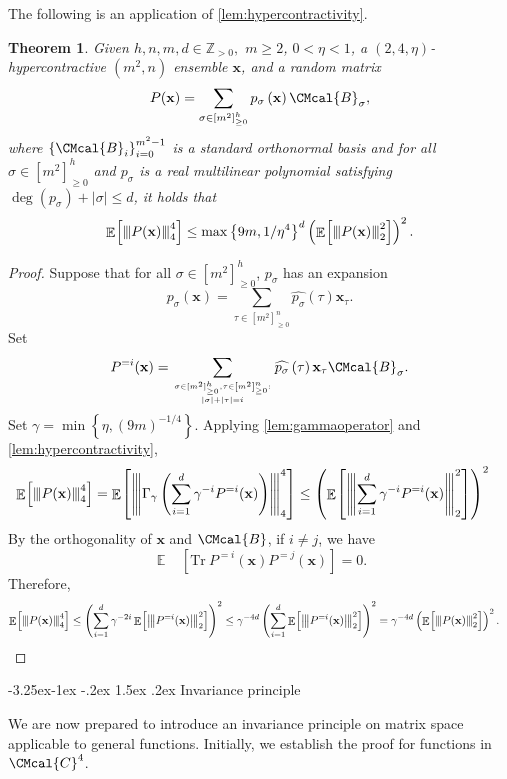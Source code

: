 \documentclass[10pt,a4paper]{article}
\makeatletter
\renewcommand{\subsection}{\@startsection{subsection}{2}{\z@}%
             {-3.25ex\@plus -1ex \@minus -.2ex}%
             {1.5ex \@plus .2ex}%
             {\normalfont\large\scshape\bfseries}}
\def\B{\CMcal{B}}
\def\C{\CMcal{C}}
\theoremstyle{plain}
\newtheorem{theorem}{Theorem}[section]
\theoremstyle{definition}
\newcommand {\minusspace} {\: \! \!}
\newcommand {\Fn} [2] {\ensuremath{ #1 \minusspace \Br{ #2 } }}
\newcommand {\set} [1] {\ensuremath{ \left\lbrace #1 \right\rbrace }}
\newcommand {\br} [1] {\ensuremath{ \left( #1 \right) }}
\newcommand {\Br} [1] {\ensuremath{ \left[ #1 \right] }}
\newcommand {\ab} [1] {\ensuremath{ \left| #1 \right| }}
\DeclareMathOperator*{\bigE}{\mathbb{E}}
\newcommand {\expec} [2] {\Fn{\bigE_{\substack{#1}}}{#2}}
\newcommand{\nnorm}[1]{{\left\vert\kern-0.25ex\left\vert\kern-0.25ex\left\vert #1
		\right\vert\kern-0.25ex\right\vert\kern-0.25ex\right\vert}}
\newcommand {\Tr} {\ensuremath{ \mathrm{Tr} }}
\newcommand{\posint}{{\mathbb Z}_{>0}}
\newcommand{\randx}{\ensuremath{\mathbf{x}}}
\newcommand{\1}{\mathbb{1}} %
\makeatother
\begin{document}
	The following is an application of \cref{lem:hypercontractivity}.
	\begin{theorem}\label{lem:hybridHC}
		Given $h,n,m,d\in\posint,$ $m\geq 2$, $0<\eta<1$, a $(2,4,\eta)$-hypercontractive  $(m^2,n)$ ensemble $\randx$, and a random matrix
 \begin{equation*}
P(\randx)=\sum_{\sigma\in\Br{m^2}_{\geq0}^h}p_\sigma\br{\randx}\B_\sigma,
	\end{equation*}
	where $\set{\B_i}_{i=0}^{m^2-1}$ is a standard orthonormal basis and for all $\sigma\in\Br{m^2}_{\geq0}^h$ and $p_\sigma$ is a real multilinear polynomial satisfying $\deg\br{p_\sigma}+\ab{\sigma}\leq d$, it holds that
   \[\expec{}{\nnorm{P(\randx)}_4^4}\leq\max\set{9m,1/\eta^4}^d\br{\expec{}{\nnorm{P(\randx)}_2^2}}^2.\]
	\end{theorem}
	\begin{proof}
	Suppose that for all $\sigma\in[m^2]_{\geq0}^h$, $p_\sigma$ has an expansion
\[p_\sigma(\randx)=\sum_{\tau\in\Br{m^2}_{\geq0}^n}\widehat{p_\sigma}(\tau)\randx_\tau.\]
		 Set $$P^{=i}(\randx)=\sum_{\genfrac{}{}{0pt}{}{\sigma\in[m^2]_{\geq0}^h,\tau\in\Br{m^2}_{\geq0}^n :}{\ab{\sigma}+\ab{\tau}=i}}\widehat{p_{\sigma}}\br{\tau}\randx_\tau\B_{\sigma}.$$
	 Set $\gamma=\min\set{\eta,\br{9m}^{-1/4}}$. Applying \cref{lem:gammaoperator} and \cref{lem:hypercontractivity},
		\begin{align*} \expec{}{\nnorm{P(\randx)}_4^4}&= \expec{}{\nnorm{\Gamma_{\gamma}\br{\sum_{i=1}^{d}\gamma^{-i} P^{=i}(\randx)}}_4^4}\leq \br{\expec{}{\nnorm{\sum_{i=1}^{d}\gamma^{-i} P^{=i}(\randx)}^2_2}}^{2}
		\end{align*}
		By the orthogonality of $\randx$ and $\B$, if $i\ne j$, we have
		\[\expec{}{\Tr~P^{=i}(\randx)P^{=j}(\randx)}=0.\]
		Therefore,
\begin{align*}
\expec{}{\nnorm{P(\randx)}_4^4}&\leq\br{\sum_{i=1}^{d}\gamma^{-2i}\expec{}{\nnorm{P^{=i}(\randx)}^2_2}}^{2}\leq\gamma^{-4d}\br{\sum_{i=1}^{d}\expec{}{\nnorm{P^{=i}(\randx)}^2_2}}^{2}=\gamma^{-4d}\br{\expec{}{\nnorm{P(\randx)}_2^2}}^2.
\end{align*}
		
	\end{proof}
	
\subsection{Invariance principle}

We are now prepared to introduce an invariance principle on matrix space applicable to general functions. Initially, we establish the proof for functions in $\C^{4}$.
\end{document}
